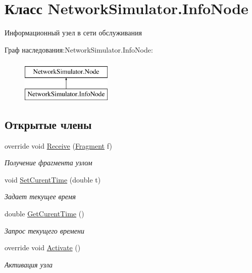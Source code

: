 \hypertarget{class_network_simulator_1_1_info_node}{}\section{Класс Network\+Simulator.\+Info\+Node}
\label{class_network_simulator_1_1_info_node}


Информационный узел в сети обслуживания  


Граф наследования\+:Network\+Simulator.\+Info\+Node\+:\begin{figure}[H]
\begin{center}
\leavevmode
\includegraphics[height=2.000000cm]{class_network_simulator_1_1_info_node}
\end{center}
\end{figure}
\subsection*{Открытые члены}
\begin{DoxyCompactItemize}
\item 
override void \hyperlink{class_network_simulator_1_1_info_node_ab05a35ee0ee90670e7c6df8fc980b96d}{Receive} (\hyperlink{class_network_simulator_1_1_fragment}{Fragment} f)
\begin{DoxyCompactList}\small\item\em Получение фрагмента узлом \end{DoxyCompactList}\item 
void \hyperlink{class_network_simulator_1_1_info_node_a99e3644d53d9feba5a9381f3a9912eec}{Set\+Curent\+Time} (double t)
\begin{DoxyCompactList}\small\item\em Задает текущее время \end{DoxyCompactList}\item 
double \hyperlink{class_network_simulator_1_1_info_node_ada80a234225d01f27a5a56e555d9793a}{Get\+Curent\+Time} ()
\begin{DoxyCompactList}\small\item\em Запрос текущего времени \end{DoxyCompactList}\item 
override void \hyperlink{class_network_simulator_1_1_info_node_aa471806f51a9c5c8481b78932d1afad1}{Activate} ()
\begin{DoxyCompactList}\small\item\em Активация узла \end{DoxyCompactList}\end{DoxyCompactItemize}
